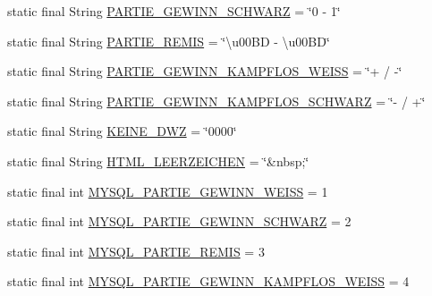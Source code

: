 \begin{DoxyCompactItemize}
\item 
static final String \hyperlink{classde_1_1turnierverwaltung_1_1model_1_1_tournament_constants_a8034511936fdcfabaa6e4c0946adb185}{P\+A\+R\+T\+I\+E\+\_\+\+G\+E\+W\+I\+N\+N\+\_\+\+S\+C\+H\+W\+A\+RZ} = \char`\"{}0 -\/ 1\char`\"{}
\item 
static final String \hyperlink{classde_1_1turnierverwaltung_1_1model_1_1_tournament_constants_a79a4b55f854d3bd6abbc851c17be0cb8}{P\+A\+R\+T\+I\+E\+\_\+\+R\+E\+M\+IS} = \char`\"{}\textbackslash{}u00\+BD -\/ \textbackslash{}u00\+BD\char`\"{}
\item 
static final String \hyperlink{classde_1_1turnierverwaltung_1_1model_1_1_tournament_constants_afb90ea3965d61dda18357b1620d77a8a}{P\+A\+R\+T\+I\+E\+\_\+\+G\+E\+W\+I\+N\+N\+\_\+\+K\+A\+M\+P\+F\+L\+O\+S\+\_\+\+W\+E\+I\+SS} = \char`\"{}+ / -\/\char`\"{}
\item 
static final String \hyperlink{classde_1_1turnierverwaltung_1_1model_1_1_tournament_constants_a838e7c158acddb62b791384874d8042d}{P\+A\+R\+T\+I\+E\+\_\+\+G\+E\+W\+I\+N\+N\+\_\+\+K\+A\+M\+P\+F\+L\+O\+S\+\_\+\+S\+C\+H\+W\+A\+RZ} = \char`\"{}-\/ / +\char`\"{}
\item 
static final String \hyperlink{classde_1_1turnierverwaltung_1_1model_1_1_tournament_constants_abf10d611bbd6d930d49e3bde3b70334a}{K\+E\+I\+N\+E\+\_\+\+D\+WZ} = \char`\"{}0000\char`\"{}
\item 
static final String \hyperlink{classde_1_1turnierverwaltung_1_1model_1_1_tournament_constants_a72f6962331ecc929576e9896eead563c}{H\+T\+M\+L\+\_\+\+L\+E\+E\+R\+Z\+E\+I\+C\+H\+EN} = \char`\"{}\&nbsp;\char`\"{}
\item 
static final int \hyperlink{classde_1_1turnierverwaltung_1_1model_1_1_tournament_constants_ab2fd51e50a5a09e880a89b34727037eb}{M\+Y\+S\+Q\+L\+\_\+\+P\+A\+R\+T\+I\+E\+\_\+\+G\+E\+W\+I\+N\+N\+\_\+\+W\+E\+I\+SS} = 1
\item 
static final int \hyperlink{classde_1_1turnierverwaltung_1_1model_1_1_tournament_constants_a322de8705e3cb76d2201d80dc97e8591}{M\+Y\+S\+Q\+L\+\_\+\+P\+A\+R\+T\+I\+E\+\_\+\+G\+E\+W\+I\+N\+N\+\_\+\+S\+C\+H\+W\+A\+RZ} = 2
\item 
static final int \hyperlink{classde_1_1turnierverwaltung_1_1model_1_1_tournament_constants_a1416a1968da0733418aae377de4004c3}{M\+Y\+S\+Q\+L\+\_\+\+P\+A\+R\+T\+I\+E\+\_\+\+R\+E\+M\+IS} = 3
\item 
static final int \hyperlink{classde_1_1turnierverwaltung_1_1model_1_1_tournament_constants_a589375d83bf59b0c8e87227ba4872f35}{M\+Y\+S\+Q\+L\+\_\+\+P\+A\+R\+T\+I\+E\+\_\+\+G\+E\+W\+I\+N\+N\+\_\+\+K\+A\+M\+P\+F\+L\+O\+S\+\_\+\+W\+E\+I\+SS} = 4

\end{DoxyCompactItemize}
